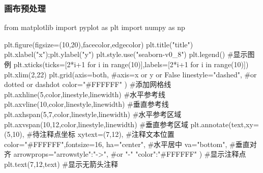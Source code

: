 \documentclass{article}
\begin{document}
      \subsubsection{画布预处理}
        \begin{codeblock}[language=python, caption={basic setup of plt}]
          from matplotlib import pyplot as plt
          import numpy as np

          plt.figure(figsize=(10,20),facecolor,edgecolor)
          plt.title("title")
          plt.xlabel("x");plt.ylabel("y")
          plt.style.use("seaborn-v0_8")
          plt.legend() #显示图例
          plt.xticks(ticks=[2*i+1 for i in range(10)],labels=[2*i+1 for i in range(10)])
          plt.xlim(2,22)
          plt.grid(axis=both, #axis=x or y or False
                  linestyle="dashed", #or dotted or dashdot
                  color="#FFFFFF"
          ) #添加网格线
          plt.axhline(5,color,linestyle,linewidth) #水平参考线
          plt.axvline(10,color,linestyle,linewidth) #垂直参考线
          plt.axhspan(5,7,color,linestyle,linewidth) #水平参考区域
          plt.axvspan(10,12,color,linestyle,linewidth) #垂直参考区域
          plt.annotate(text,xy=(5,10), #待注释点坐标
                      xytext=(7,12), #注释文本位置
                      color="#FFFFFF",fontsize=16,
                      ha="center", #水平居中
                      va="bottom", #垂直对齐
                      arrowprops={"arrowstyle":"->", #or "-"
                                  "color":"#FFFFFF"}
          ) #显示注释点
          plt.text(7,12,text) #显示无箭头注释
        \end{codeblock}
\end{document}
